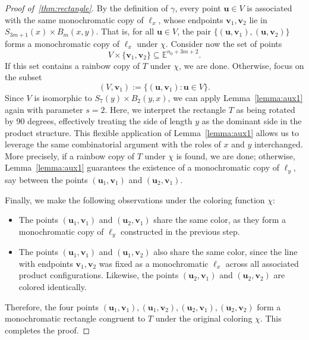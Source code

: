\documentclass[11pt]{article}
\theoremstyle{definition}
\begin{document}
\begin{proof}[Proof of~\cref{thm:rectangle}]
By the definition of \(\gamma\), every point \(\boldsymbol{u} \in V\) is associated with the same monochromatic copy of \(\ell_x\), whose endpoints \(\boldsymbol{v}_1, \boldsymbol{v}_2\) lie in \(S_{3m+1}(x) \times B_m(x,y)\). That is, for all \(\boldsymbol{u} \in V\), the pair \(\{ (\boldsymbol{u}, \boldsymbol{v}_1), (\boldsymbol{u}, \boldsymbol{v}_2) \}\) forms a monochromatic copy of \(\ell_x\) under \(\chi\). Consider now the set of points
\[
V \times \{ \boldsymbol{v}_1, \boldsymbol{v}_2 \} \subseteq \mathbb{E}^{n_0 + 3m + 2}.
\]
If this set contains a rainbow copy of \(T\) under \( \chi \), we are done. Otherwise, focus on the subset
\[
(V, \boldsymbol{v}_1) := \{ (\boldsymbol{u}, \boldsymbol{v}_1) : \boldsymbol{u} \in V \}.
\]
Since \(V\) is isomorphic to \(S_7(y) \times B_2(y, x)\), we can apply Lemma~\ref{lemma:aux1} again with parameter \(s = 2\). Here, we interpret the rectangle \(T\) as being rotated by 90 degrees, effectively treating the side of length \(y\) as the dominant side in the product structure. This flexible application of Lemma~\ref{lemma:aux1} allows us to leverage the same combinatorial argument with the roles of \(x\) and \(y\) interchanged. More precisely, if a rainbow copy of \(T\) under \(\chi\) is found, we are done; otherwise, Lemma~\ref{lemma:aux1} guarantees the existence of a monochromatic copy of \(\ell_y\), say between the points \((\boldsymbol{u}_1, \boldsymbol{v}_1)\) and \((\boldsymbol{u}_2, \boldsymbol{v}_1)\).


Finally, we make the following observations under the coloring function \(\chi\):
\begin{itemize}
    \item The points \((\boldsymbol{u}_1, \boldsymbol{v}_1)\) and \((\boldsymbol{u}_2, \boldsymbol{v}_1)\) share the same color, as they form a monochromatic copy of \(\ell_y\) constructed in the previous step. 
    \item The points \((\boldsymbol{u}_1, \boldsymbol{v}_1)\) and \((\boldsymbol{u}_1, \boldsymbol{v}_2)\) also share the same color, since the line with endpoints \(\boldsymbol{v}_1, \boldsymbol{v}_2\) was fixed as a monochromatic \(\ell_x\) across all associated product configurations. Likewise, the points \((\boldsymbol{u}_2, \boldsymbol{v}_1)\) and \((\boldsymbol{u}_2, \boldsymbol{v}_2)\) are colored identically.
\end{itemize}
Therefore, the four points \( (\boldsymbol{u}_1, \boldsymbol{v}_1),  (\boldsymbol{u}_1, \boldsymbol{v}_2), (\boldsymbol{u}_2, \boldsymbol{v}_1), (\boldsymbol{u}_2, \boldsymbol{v}_2)\) form a monochromatic rectangle congruent to \(T\) under the original coloring \(\chi\). This completes the proof.
\end{proof}
\end{document}
